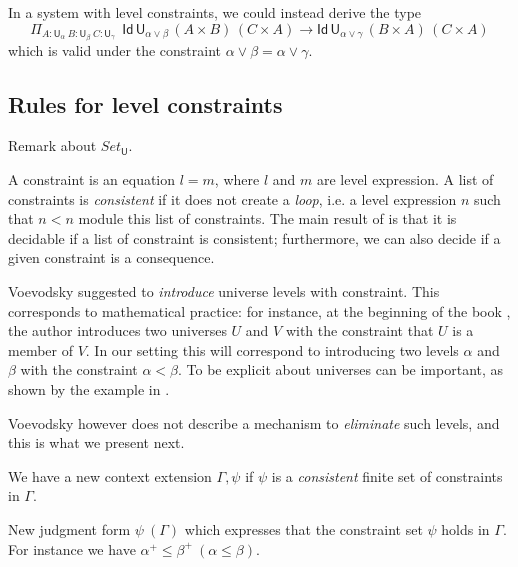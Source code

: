 \documentclass[11pt,a4paper]{article}
\theoremstyle{definition}
\newcommand{\Id}{\mathsf{Id}}
\def\UU{\mathsf{U}}
\def\Level{\mathsf{Level}}
\def\Constraint{\mathsf{Constraint}}
\begin{document}
In a system with level constraints, we could instead derive the type
$$
    \Pi_{A:\UU_\alpha~{B}:{\UU_\beta}~{C}:{\UU_\gamma}}
    {~~\Id\,\UU_{\alpha \vee \beta}\, (A\times B)\,(C \times A)
    \to \Id\,\UU_{\alpha \vee \gamma}\, (B\times A)\,(C \times A)}
$$
which is valid under the constraint
$
\alpha \vee \beta = \alpha \vee \gamma.
$

\subsection{Rules for level constraints}%

{\color{red}
  Remark about $Set_\UU$.}

A constraint is an equation $l = m$, where $l$ and $m$ are level expression.
A list of constraints is {\em consistent} if it does not create a {\em loop}, i.e.
a level expression $n$ such  that $n<n$ module this list of constraints.
The main result of \cite{bezem-coquand:lattices} is that it is decidable if a list
of constraint is consistent; furthermore, we can also decide if a given constraint
is a consequence.

Voevodsky \cite{VV} suggested to {\em introduce} universe levels with constraint. This corresponds
to mathematical practice: for instance, at the beginning of the book \cite{giraud:cohom-non-abel},
the author introduces two universes $U$ and $V$ with the constraint that $U$ is a member of $V$.
In our setting this will correspond to introducing two levels $\alpha$ and $\beta$ with the
constraint $\alpha<\beta$. To be explicit about universes can be important, as shown by the
example in \cite{chambert-loir:universes-matter,waterhouse:sheaves}.

Voevodsky however does not describe a mechanism to {\em eliminate}
such levels, and this is what we present next.



\medskip





We  have a new context extension $\Gamma,\psi$ if $\psi$ is a {\em consistent}
finite set of constraints in $\Gamma$.

New judgment form $\psi~(\Gamma)$ which expresses that the constraint set $\psi$
holds in $\Gamma$. For instance we have $\alpha^+\leqslant\beta^+~(\alpha\leqslant\beta)$.
\end{document}
